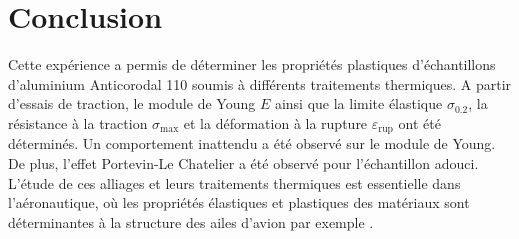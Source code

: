 \section{Conclusion}

Cette expérience a permis de déterminer les propriétés plastiques d'échantillons d'aluminium Anticorodal 110 soumis à différents traitements thermiques. A partir d'essais de traction, le module de Young \(E\) ainsi que la limite élastique \(\sigma_{0.2}\), la résistance à la traction \(\sigma_{\textrm{max}}\) et la déformation à la rupture \(\varepsilon_{\textrm{rup}}\) ont été déterminés. Un comportement inattendu a été observé sur le module de Young. De plus, l'effet Portevin-Le Chatelier a été observé pour l'échantillon adouci. L'étude de ces alliages et leurs traitements thermiques est essentielle dans l'aéronautique, où les propriétés élastiques et plastiques des matériaux sont déterminantes à la structure des ailes d'avion par exemple \cite{aluminium}.